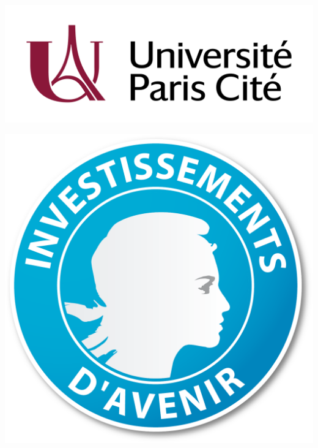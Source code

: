 \documentclass[11pt,a4paper]{article}
\begin{document}
\begin{titlepage}
    \begin{minipage}{0.25\textwidth}
        \includegraphics[width=\linewidth]{Logos/UniversiteParisCite_logo_horizontal_couleur_RVB_Couleur.png}\par\vspace{1cm}
        \includegraphics[width=\linewidth]{Logos/PIA_logo.png}\par\vspace{1cm}
    \end{minipage}
    \begin{minipage}{0.25\textwidth}

\end{minipage}
\end{titlepage}
\end{document}
